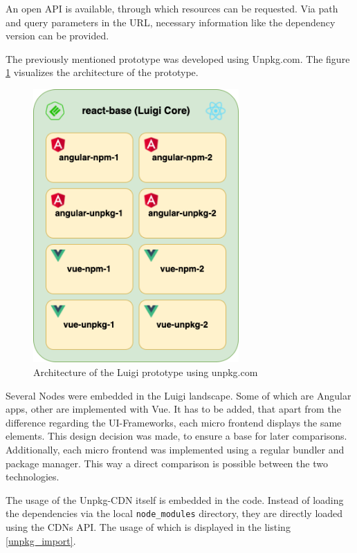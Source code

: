 An open API is available, through which resources can be requested. Via path and query parameters in the URL, necessary information like the dependency version can be provided.

The previously mentioned prototype was developed using Unpkg.com. The figure \ref{fig:unpkg_prototype_architecture} visualizes the architecture of the prototype.

\begin{figure}[!h]
	\centering
	\includegraphics[width=0.7\textwidth]{Figures/unpkg.architecture.drawio.png}
	\caption{Architecture of the Luigi prototype using unpkg.com}
	\label{fig:unpkg_prototype_architecture}
\end{figure}
\newpage
Several Nodes were embedded in the Luigi landscape. Some of which are Angular apps, other are implemented with Vue. It has to be added, that apart from the difference regarding the UI-Frameworks, each micro frontend displays the same elements. This design decision was made, to ensure a base for later comparisons. Additionally, each micro frontend was implemented using a regular bundler and package manager. This way a direct comparison is possible between the two technologies.

The usage of the Unpkg-CDN itself is embedded in the code. Instead of loading the dependencies via the local \texttt{node\_modules} directory, they are directly loaded using the CDNs API. The usage of which is displayed in the listing \ref{unpkg_import}.

